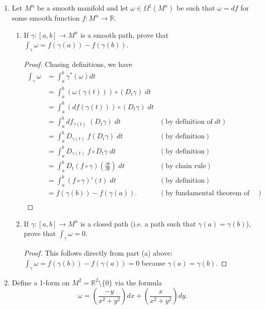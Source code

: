 \documentclass{article}
\begin{document}
\begin{enumerate}[label={\bf Q\arabic*:}]
  \item Let $M^n$ be a smooth manifold and let $\omega\in\Omega^1(M^n)$ be
    such that $\omega=df$ for some smooth function
    $f:M^n\rightarrow\mathbb{R}$.

    \begin{enumerate}
      \item If $\gamma:[a,b]\rightarrow M^n$ is a smooth path, prove that
        $\int_\gamma\omega=f(\gamma(a))-f(\gamma(b))$.
        \begin{proof}
          Chasing definitions, we have
          \begin{align*}
            \int_\gamma\omega &=\int_a^b\gamma^*(\omega)dt \\
              &=\int_a^b(\omega(\gamma(t))) \circ(D_t\gamma)\; dt \\
              &=\int_a^b(df(\gamma(t))) \circ(D_t\gamma)\; dt \\
              &=\int_a^b df_{\gamma(t)}\; (D_t\gamma)\; dt &(\text{by
                definition of}\; dt) \\
              &=\int_a^b D_{\gamma(t)}\; f(D_t\gamma)\; dt &(\text{by
                definition}) \\
              &=\int_a^b D_{\gamma(t)}\; f\circ D_t\gamma\; dt &(\text{by
                definition}) \\
              &=\int_a^b D_{t}(f\circ\gamma)(\frac{\partial t}{\partial
                t})\; dt &(\text{by chain rule}) \\
              &=\int_a^b (f\circ\gamma)'(t)\; dt &(\text{by definition}) \\
              &=f(\gamma(b))-f(\gamma(a)). &(\text{by fundamental theorem of
                calculus}) \\
          \end{align*}
        \end{proof}

      \item If $\gamma:[a,b]\rightarrow M^n$ is a closed path (i.e. a path
        such that $\gamma(a)=\gamma(b)$), prove that $\int_\gamma\omega=0$.
        \begin{proof}
          This follows directly from part (a) above:
          $\int_\gamma\omega=f(\gamma(b))-f(\gamma(a))=0$ because
          $\gamma(a)=\gamma(b)$.
        \end{proof}
    \end{enumerate}

  \item Define a 1-form on $M^2=\mathbb{R}^2\setminus\{0\}$ via the formula
    \[\omega =\left(\frac{-y}{x^2+y^2}\right)dx
    +\left(\frac{x}{x^2+y^2}\right)dy.\]


\end{enumerate}
\end{document}
